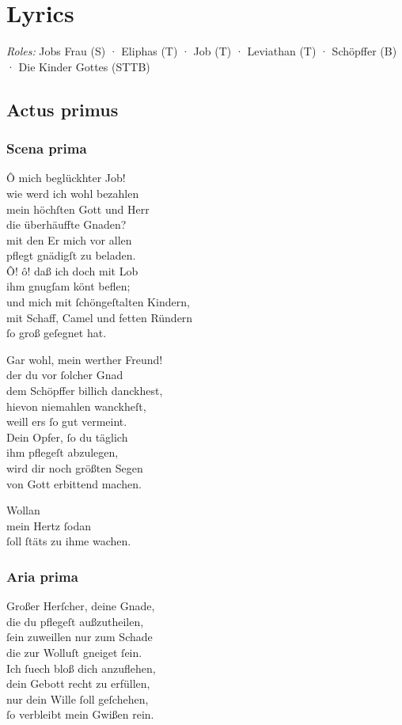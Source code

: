\documentclass{ees}
\newenvironment{lyrics}[1]{%
  \subsection{#1}\nopagebreak%
  \begin{lyricslist}%
  \let\voice\item%
}{%
  \end{lyricslist}%
}
\begin{document}
\clearscrheadfoot

\chapter{Lyrics}

\textit{Roles:} Jobs Frau (S) · Eliphas (T) · Job (T) · Leviathan (T) · Schöpffer (B) · Die Kinder Gottes (STTB)

\section{Actus primus}

\begin{lyrics}{Scena prima}
  \voice[Job]
  Ô mich beglückhter Job!\\
  wie werd ich wohl bezahlen\\
  mein höchſten Gott und Herr\\
  die überhäuffte Gnaden?\\
  mit den Er mich vor allen\\
  pflegt gnädigſt zu beladen.\\
  Ô! ô! daß ich doch mit Lob\\
  ihm gnugſam könt beflen;\\
  und mich mit ſchöngeſtalten Kindern,\\
  mit Schaff, Camel und fetten Ründern\\
  ſo groß geſegnet hat.

  \voice[Eliphas]
  Gar wohl, mein werther Freund!\\
  der du vor ſolcher Gnad\\
  dem Schöpffer billich danckhest,\\
  hievon niemahlen wanckheſt,\\
  weill ers ſo gut vermeint.\\
  Dein Opfer, ſo du täglich\\
  ihm pflegeſt abzulegen,\\
  wird dir noch größten Segen\\
  von Gott erbittend machen.

  \voice[Job]
  Wollan\\
  mein Hertz ſodan\\
  ſoll ſtäts zu ihme wachen.
\end{lyrics}

\begin{lyrics}{Aria prima}
  \voice[Job]
  Großer Herſcher, deine Gnade,\\
  die du pflegeſt außzutheilen,\\
  ſein zuweillen nur zum Schade\\
  die zur Wolluſt gneiget ſein.\\[1ex]
  Ich ſuech bloß dich anzuflehen,\\
  dein Gebott recht zu erfüllen,\\
  nur dein Wille ſoll geſchehen,\\
  ſo verbleibt mein Gwißen rein.
\end{lyrics}
\end{document}
